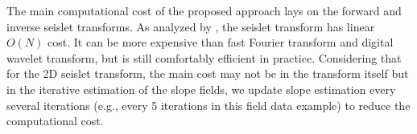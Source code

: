 The main computational cost of the proposed approach lays on the forward and inverse seislet transforms. As analyzed by \cite{seislet}, the seislet transform has linear $O(N)$ cost. It can be more expensive than fast Fourier transform and digital wavelet transform, but is still comfortably efficient in practice. Considering that for the 2D seislet transform, the main cost may not be in the transform itself but in the iterative estimation of the slope fields, we update slope estimation every several iterations (e.g., every 5 iterations in this field data example) to reduce the computational cost.






